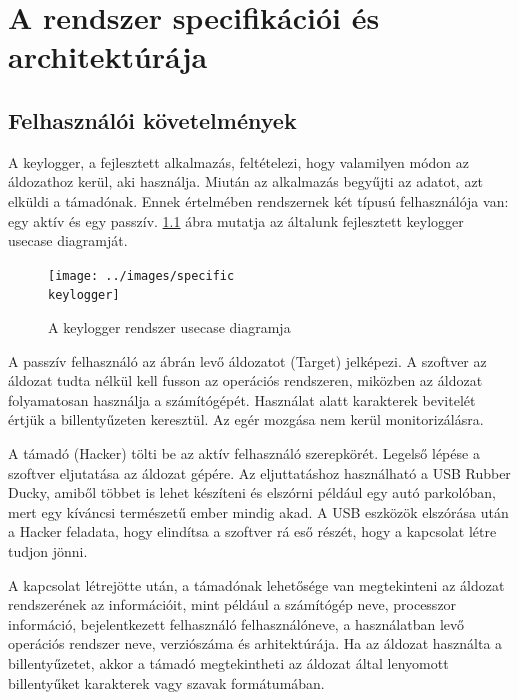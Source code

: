 \documentclass[12pt,a4paper,oneside]{report}
\begin{document}
\chapter{A rendszer specifikációi és architektúrája}\label{sec:specs_and_arch}

\section{Felhasználói követelmények}
A keylogger, a fejlesztett alkalmazás, feltételezi, hogy valamilyen módon az áldozathoz kerül, aki használja. Miután az alkalmazás begyűjti az adatot, azt elküldi a támadónak. Ennek értelmében rendszernek két típusú felhasználója van: egy aktív és egy passzív. \ref{fig:specifickeylogger} ábra mutatja az általunk fejlesztett keylogger usecase diagramját.
\begin{figure}[H]
\centering
\texttt{[image: ../images/specific\\ keylogger]}
\caption{A keylogger rendszer usecase diagramja}
\label{fig:specifickeylogger}
\end{figure}

A passzív felhasználó az ábrán levő áldozatot (Target) jelképezi. A szoftver az áldozat tudta nélkül kell fusson az operációs rendszeren, miközben az áldozat folyamatosan használja a számítógépét. Használat alatt karakterek bevitelét értjük a billentyűzeten keresztül. Az egér mozgása nem kerül monitorizálásra.

A támadó (Hacker) tölti be az aktív felhasználó szerepkörét. Legelső lépése a szoftver eljutatása az áldozat gépére. Az eljuttatáshoz használható a USB Rubber Ducky, amiből többet is lehet készíteni és elszórni például egy autó parkolóban, mert egy kíváncsi természetű ember mindig akad. A USB eszközök elszórása után a Hacker feladata, hogy elindítsa a szoftver rá eső részét, hogy a kapcsolat létre tudjon jönni.

A kapcsolat létrejötte után, a támadónak lehetősége van megtekinteni az áldozat rendszerének az információit, mint például a számítógép neve, processzor információ, bejelentkezett felhasználó felhasználóneve, a használatban levő operációs rendszer neve, verziószáma és arhitektúrája. Ha az áldozat használta a billentyűzetet, akkor a támadó megtekintheti az áldozat által lenyomott billentyűket karakterek vagy szavak formátumában.
\end{document}
